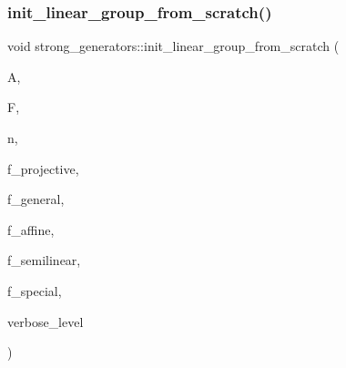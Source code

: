 \subsubsection{\texorpdfstring{init\+\_\+linear\+\_\+group\+\_\+from\+\_\+scratch()}{init\_linear\_group\_from\_scratch()}}
{\footnotesize\ttfamily void strong\+\_\+generators\+::init\+\_\+linear\+\_\+group\+\_\+from\+\_\+scratch (\begin{DoxyParamCaption}\item[{\mbox{\hyperlink{classaction}{action}} $\ast$\&}]{A,  }\item[{\mbox{\hyperlink{classfinite__field}{finite\+\_\+field}} $\ast$}]{F,  }\item[{\mbox{\hyperlink{galois_8h_a09fddde158a3a20bd2dcadb609de11dc}{I\+NT}}}]{n,  }\item[{\mbox{\hyperlink{galois_8h_a09fddde158a3a20bd2dcadb609de11dc}{I\+NT}}}]{f\+\_\+projective,  }\item[{\mbox{\hyperlink{galois_8h_a09fddde158a3a20bd2dcadb609de11dc}{I\+NT}}}]{f\+\_\+general,  }\item[{\mbox{\hyperlink{galois_8h_a09fddde158a3a20bd2dcadb609de11dc}{I\+NT}}}]{f\+\_\+affine,  }\item[{\mbox{\hyperlink{galois_8h_a09fddde158a3a20bd2dcadb609de11dc}{I\+NT}}}]{f\+\_\+semilinear,  }\item[{\mbox{\hyperlink{galois_8h_a09fddde158a3a20bd2dcadb609de11dc}{I\+NT}}}]{f\+\_\+special,  }\item[{\mbox{\hyperlink{galois_8h_a09fddde158a3a20bd2dcadb609de11dc}{I\+NT}}}]{verbose\+\_\+level }\end{DoxyParamCaption})}

\mbox{\label{classstrong__generators_a51fbf5e2eeb7ad0c700315ccb4001781}} 
